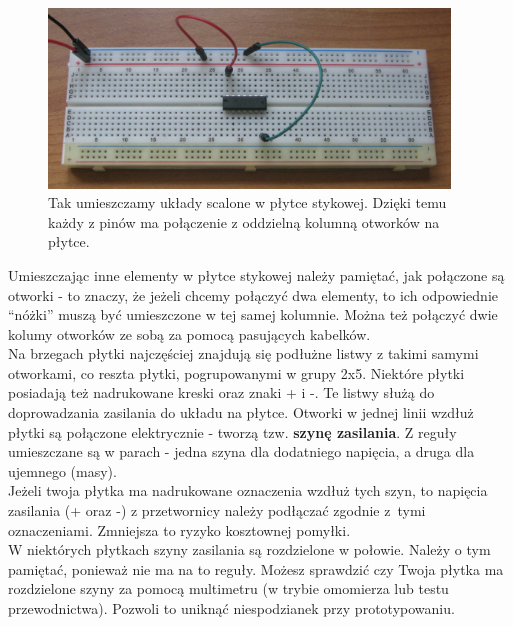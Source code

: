 \begin{figure}[h!]\begin{Ramka}{}\begin{center}
  \noindent\includegraphics[width=0.95\textwidth]{warsztat_elektroniczny/dip_ic}\\
  Tak umieszczamy układy scalone w płytce stykowej. Dzięki temu każdy z pinów ma połączenie z oddzielną kolumną otworków na płytce.
\end{center}\end{Ramka}\end{figure}

Umieszczając inne elementy w płytce stykowej należy pamiętać, jak połączone są otworki - to znaczy, że jeżeli chcemy
połączyć dwa elementy, to ich odpowiednie ``nóżki'' muszą być umieszczone w tej samej kolumnie. Można też połączyć dwie kolumy otworków
ze sobą za pomocą pasujących kabelków.
\\

Na brzegach płytki najczęściej znajdują się podłużne listwy z takimi samymi otworkami, co reszta płytki, pogrupowanymi w grupy 2x5.
Niektóre płytki posiadają też nadrukowane kreski oraz znaki + i -. Te listwy służą do doprowadzania
zasilania do układu na płytce. Otworki w jednej linii wzdłuż płytki są połączone elektrycznie - tworzą tzw.
\textbf{szynę zasilania}. Z reguły umieszczane są w parach - jedna szyna dla dodatniego napięcia, a druga dla ujemnego (masy).\\

Jeżeli twoja płytka ma nadrukowane oznaczenia wzdłuż tych szyn, to napięcia zasilania (+ oraz -) z przetwornicy należy podłączać zgodnie z~tymi
oznaczeniami. Zmniejsza to ryzyko kosztownej pomyłki.\\

W niektórych płytkach szyny zasilania są rozdzielone w połowie. Należy o tym pamiętać, ponieważ nie ma na to reguły.
Możesz sprawdzić czy Twoja płytka ma rozdzielone szyny za pomocą multimetru (w trybie omomierza lub testu przewodnictwa). Pozwoli to uniknąć
niespodzianek przy prototypowaniu.

